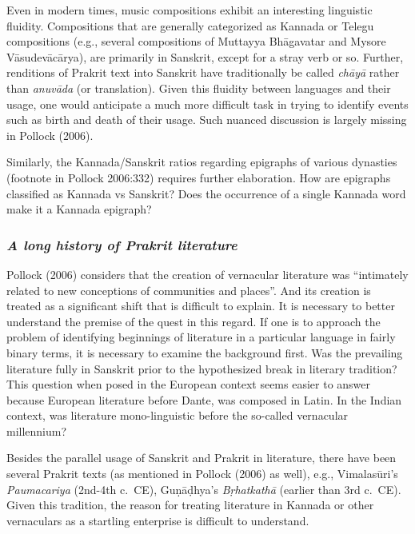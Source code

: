 Even in modern times, music compositions exhibit an interesting linguistic fluidity. Compositions that are generally categorized as Kannada or Telegu compositions (e.g., several compositions of Muttayya Bhāgavatar and Mysore Vāsudevācārya), are primarily in Sanskrit, except for a stray verb or so. Further, renditions of Prakrit text into Sanskrit have traditionally be called {\sl chāyā} rather than {\sl anuvāda} (or translation). Given this fluidity between languages and their usage, one would anticipate a much more difficult task in trying to identify events such as birth and death of their usage. Such nuanced discussion is largely missing in Pollock (2006). 

Similarly, the Kannada/Sanskrit ratios regarding epigraphs of various dynasties (footnote in Pollock 2006:332) requires further elaboration. How are epigraphs classified as Kannada vs Sanskrit? Does the occurrence of a single Kannada word make it a Kannada epigraph?
\vskip -40pt

\subsubsection{{\sl A long history of Prakrit literature}}
\vskip -5pt

Pollock (2006) considers that the creation of vernacular literature was “intimately related to new conceptions of communities and places”. And its creation is treated as a significant shift that is difficult to explain. It is necessary to better understand the premise of the quest in this regard. If one is to approach the problem of identifying beginnings of literature in a particular language in fairly binary terms, it is necessary to examine the background first. Was the prevailing literature fully in Sanskrit prior to the hypothesized break in literary tradition? This question when posed in the European context seems easier to answer because European literature before Dante, was composed in Latin.  In the Indian context, was literature mono-linguistic before the so-called vernacular millennium?

Besides the parallel usage of Sanskrit and Prakrit in literature, there have been several Prakrit texts (as mentioned in Pollock (2006) as well), e.g., Vimalasūri’s {\sl Paumacariya} (2nd-4th c.\ CE), Guṇāḍhya’s {\sl Bṛhatkathā} (earlier than 3rd c.\ CE). Given this tradition, the reason for treating literature in Kannada or other vernaculars as a startling enterprise is difficult to understand.

